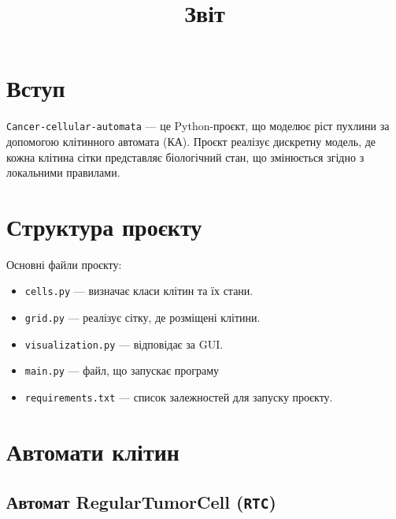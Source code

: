 \documentclass[12pt]{article}
\title{Звіт}
\begin{document}
\section{Вступ}

\texttt{Cancer-cellular-automata} --- це Python-проєкт, що моделює ріст пухлини за допомогою клітинного автомата (КА). Проєкт реалізує дискретну модель, де кожна клітина сітки представляє біологічний стан, що змінюється згідно з локальними правилами.

\section{Структура проєкту}

Основні файли проєкту:

\begin{itemize}
  \item \texttt{cells.py} --- визначає класи клітин та їх стани.
  \item \texttt{grid.py} --- реалізує сітку, де розміщені клітини.
  \item \texttt{visualization.py} --- відповідає за GUI.
  \item \texttt{main.py} --- файл, що запускає програму
  \item \texttt{requirements.txt} --- список залежностей для запуску проєкту.
\end{itemize}

\section{Автомати клітин}
\subsection{Автомат RegularTumorCell (\texttt{RTC})}
\end{document}
